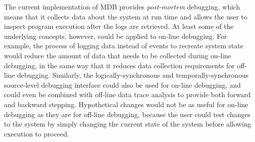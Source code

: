 The current implementation of MDB provides \emph{post-mortem} debugging, which
means that it collects data about the system at run time and allows the user to
inspect program execution after the logs are retrieved.  At least some of the
underlying concepts, however, could be applied to on-line debugging.  For
example, the process of logging data instead of events to recreate system state
would reduce the amount of data that needs to be collected during on-line
debugging, in the same way that it reduces data collection requirements for
off-line debugging.  Similarly, the logically-synchronous and
temporally-synchronous source-level debugging interface could also be used for
on-line debugging, and could even be combined with off-line data trace analysis to
provide both forward and backward stepping. Hypothetical changes would not be as
useful for on-line debugging as they are for off-line debugging, because the
user could test changes to the system by simply changing the current state of
the system before allowing execution to proceed.

